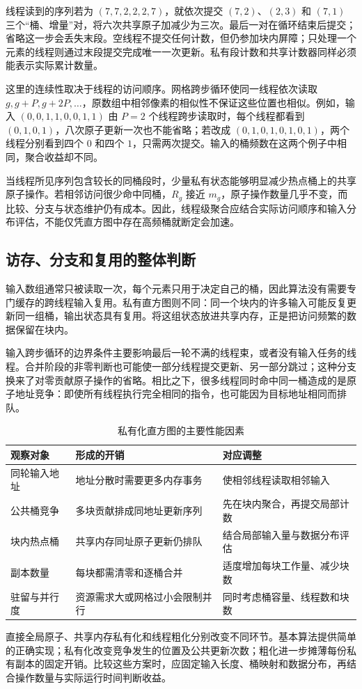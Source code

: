 线程读到的序列若为 $(7,7,2,2,2,7)$，就依次提交 $(7,2)$、$(2,3)$ 和 $(7,1)$ 三个“桶、增量”对，将六次共享原子加减少为三次。最后一对在循环结束后提交；省略这一步会丢失末段。空线程不提交任何计数，但仍参加块内屏障；只处理一个元素的线程则通过末段提交完成唯一一次更新。私有段计数和共享计数器同样必须能表示实际累计数量。

这里的连续性取决于线程的访问顺序。网格跨步循环使同一线程依次读取 $g,g+P,g+2P,\ldots$，原数组中相邻像素的相似性不保证这些位置也相似。例如，输入 $(0,0,1,1,0,0,1,1)$ 由 $P=2$ 个线程跨步读取时，每个线程都看到 $(0,1,0,1)$，八次原子更新一次也不能省略；若改成 $(0,1,0,1,0,1,0,1)$，两个线程分别看到四个 $0$ 和四个 $1$，只需两次提交。输入的桶频数在这两个例子中相同，聚合收益却不同。

当线程所见序列包含较长的同桶段时，少量私有状态能够明显减少热点桶上的共享原子操作。若相邻访问很少命中同桶，$R_g$ 接近 $m_g$，原子操作数量几乎不变，而比较、分支与状态维护仍有成本。因此，线程级聚合应结合实际访问顺序和输入分布评估，不能仅凭直方图中存在高频桶就断定会加速。

\subsection{访存、分支和复用的整体判断}

输入数组通常只被读取一次，每个元素只用于决定自己的桶，因此算法没有需要专门缓存的跨线程输入复用。私有直方图则不同：同一个块内的许多输入可能反复更新同一组桶，输出状态具有复用。将这组状态放进共享内存，正是把访问频繁的数据保留在块内。

输入跨步循环的边界条件主要影响最后一轮不满的线程束，或者没有输入任务的线程。合并阶段的非零判断也可能使一部分线程提交更新、另一部分跳过；这种分支换来了对零贡献原子操作的省略。相比之下，很多线程同时命中同一桶造成的是原子地址竞争：即使所有线程执行完全相同的指令，也可能因为目标地址相同而排队。

\begin{table}[htbp]
\centering
\caption{私有化直方图的主要性能因素}
\label{l13:tab:performance-factors}
\small
\begin{tabularx}{\textwidth}{>{\raggedright\arraybackslash}p{2.0cm}YY}
\toprule
观察对象 & 形成的开销 & 对应调整 \\
\midrule
同轮输入地址 & 地址分散时需要更多内存事务 & 使相邻线程读取相邻输入 \\
公共桶竞争 & 多块贡献排成同地址更新序列 & 先在块内聚合，再提交局部计数 \\
块内热点桶 & 共享内存同址原子更新仍排队 & 结合局部输入量与数据分布评估 \\
副本数量 & 每块都需清零和逐桶合并 & 适度增加每块工作量、减少块数 \\
驻留与并行度 & 资源需求大或网格过小会限制并行 & 同时考虑桶容量、线程数和块数 \\
\bottomrule
\end{tabularx}
\end{table}

直接全局原子、共享内存私有化和线程粗化分别改变不同环节。基本算法提供简单的正确实现；私有化改变竞争发生的位置及公共更新次数；粗化进一步摊薄每份私有副本的固定开销。比较这些方案时，应固定输入长度、桶映射和数据分布，再结合操作数量与实际运行时间判断收益。
